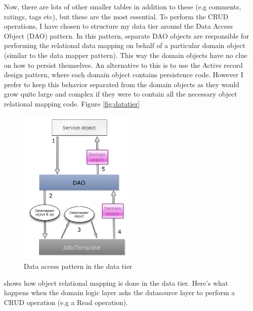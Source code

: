 Now, there are lots of other smaller tables in addition to these (e.g comments, ratings, tags etc), but these are the most essential. To perform the CRUD operations, I have chosen to structure my data tier around the Data Access Object (DAO) pattern. In this pattern, separate DAO objects are responsible for performing the relational data mapping on behalf of a particular domain object (similar to the data mapper pattern). This way the domain objects have no clue on how to persist themselves. An alternative to this is to use the Active record design pattern, where each domain object contains persistence code. However I prefer to keep this behavior separated from the domain objects as they would grow quite large and complex if they were to contain all the necessary object relational mapping code. Figure \vref{fig:datatier}
	\begin{figure}
	  \begin{center}
	    \includegraphics[width=0.5\textwidth]{images/datatier.jpg}
	  \end{center}
	  \caption{Data access pattern in the data tier}  \label{fig:datatier}
	\end{figure} 
shows how object relational mapping is done in the data tier. Here's what happens when the domain logic layer asks the datasource layer to perform a CRUD operation (e.g a Read operation).
		
